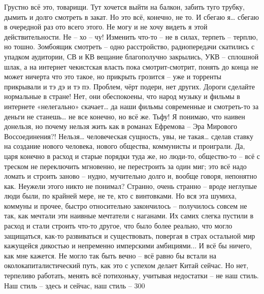 Грустно всё это, товарищи. Тут хочется выйти на балкон, забить туго трубку, дымить и долго смотреть в закат. Но это всё, конечно, не то. И сбегаю я… сбегаю в очередной раз ото всего этого. Не могу и не хочу видеть я этой действительности. Не – хо – чу! Изменить что-то – не в силах, терпеть – терплю, но тошно. Зомбоящик смотреть – одно расстройство, радиопередачи скатились с упадком аудитории, СВ и КВ вещание благополучно закрылись, УКВ – сплошной шлак, а на интернет чекистская власть пока смотрит-смотрит, понять до конца не может ничерта что это такое, но прикрыть грозится – уже и торренты прикрывали и тэ дэ и тэ пэ. Проблем, чёрт подери, нет других. Дороги сделайте нормальные в стране! Нет, они обеспокоены, что народ музыку и фильмы в интернете «нелегально» скачает… да наши фильмы современные и смотреть-то за деньги не станешь… не все конечно, но всё же. Тьфу!
Я понимаю, что наивен донельзя, но почему нельзя жить как в романах Ефремова – Эра Мирового Воссоединения?! Нельзя… человеческая сущность, увы, не такая… сделав ставку на создание нового человека, нового общества, коммунисты и проиграли. Да, царя конечно в расход и старые порядки туда же, но люди-то, общество-то – всё с треском не переключить мгновенно, не перестроить за один миг; это всё надо ломать и строить заново – нудно, мучительно долго и, вообще говоря, непонятно как. Неужели этого никто не понимал? Странно, очень странно – вроде неглупые люди были, по крайней мере, не те, кто с винтовками. Но вся эта шумиха, коммуны и прочее, быстро относительно закончилось – получилось совсем не так, как мечтали эти наивные мечтатели с наганами. Их самих слегка пустили в расход и стали строить что-то другое, что было более реально, что могло защищаться, как-то развиваться и существовать, повергая в страх остальной мир кажущейся дикостью и непременно имперскими амбициями...
И всё бы ничего, как мне кажется. Не могло так быть вечно – всё равно бы встали на околокапиталистический путь, как это с успехом делает Китай сейчас. Но нет, терпеливо работать, менять всё потихоньку, учитывая недостатки – не наш стиль. Наш стиль – здесь и сейчас, наш стиль – 300%

